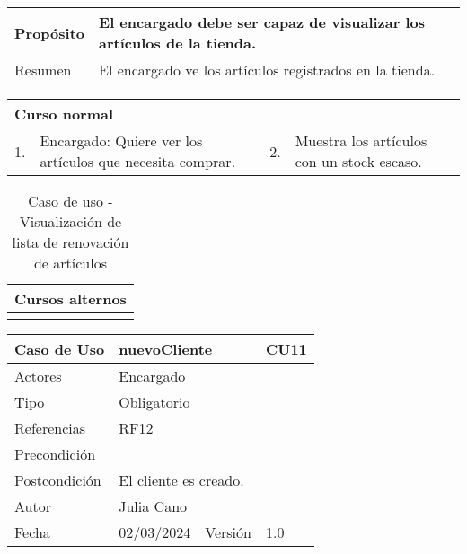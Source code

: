 \begin{table}[H]
	\centering
	\begin{tabular}{| m{} | m{} | m{} | m{} |}
		\hline
		Propósito & \multicolumn{3}{m{0.67\textwidth}|}{El encargado debe ser capaz de visualizar los artículos de la tienda.}  \\ 
		\hline
		Resumen & \multicolumn{3}{m{0.67\textwidth}|}{El encargado ve los artículos registrados en la tienda.} \\ 
		\hline
	\end{tabular}
\end{table}


\begin{table}[H]
	\centering
	\begin{tabular}{| m{} | m{} | m{} | m{} |}
		\hline
		\multicolumn{4}{|m{0.9\textwidth}|}{Curso normal}     \\ 
		\hline
		1. & Encargado: Quiere ver los artículos que necesita comprar. & 2. &  Muestra  los artículos con un stock escaso.  \\ 
		\hline
	\end{tabular}
\end{table}

\begin{table}[H]
	\centering
	\begin{tabular}{| m{} | m{} | m{} | m{} |}
		\hline
		\multicolumn{4}{|m{0.9\textwidth}|}{Cursos alternos}     \\ 
		\hline
		& \multicolumn{3}{m{0.67\textwidth}|}{} \\ 
		\hline
	\end{tabular}
	\caption{Caso de uso - Visualización de lista de renovación de artículos}
\end{table}

\newpage


\begin{table}[H]
	\centering
	\begin{tabular}{| m{} | m{} | m{} | m{}|}
		\hline
		\rowcolor{grayshade} Caso de Uso & \multicolumn{2}{|m{0.43\textwidth}|}{nuevoCliente} &  CU11\\ 
		\hline
		Actores & \multicolumn{3}{l|}{Encargado} \\ 
		\hline
		Tipo & \multicolumn{3}{l|}{Obligatorio} \\ 
		\hline
		Referencias & \multicolumn{3}{l|}{RF12} \\ 
		\hline
		Precondición & \multicolumn{3}{m{0.67\textwidth}|}{} \\ 
		\hline
		Postcondición & \multicolumn{3}{m{0.67\textwidth}|}{El cliente es creado.} \\ 
		\hline
		Autor & \multicolumn{3}{l|}{Julia Cano} \\ 
		\hline
		Fecha & 02/03/2024 & Versión & 1.0 \\
		\hline
	\end{tabular}
\end{table}

